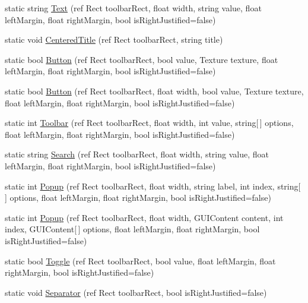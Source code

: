 \begin{DoxyCompactItemize}
\item 
static string \hyperlink{classi_c_s___toolbar_utility_a828d8ef03673fa9ca0ac975ea54c107c}{Text} (ref Rect toolbar\+Rect, float width, string value, float left\+Margin, float right\+Margin, bool is\+Right\+Justified=false)
\item 
static void \hyperlink{classi_c_s___toolbar_utility_a27830d2afaa33f6ea20f2902aba76610}{Centered\+Title} (ref Rect toolbar\+Rect, string title)
\item 
static bool \hyperlink{classi_c_s___toolbar_utility_aa10b6772c9b08273ec8ab80703292d71}{Button} (ref Rect toolbar\+Rect, bool value, Texture texture, float left\+Margin, float right\+Margin, bool is\+Right\+Justified=false)
\item 
static bool \hyperlink{classi_c_s___toolbar_utility_af9750ad44ed9e1962da00ee9c7672781}{Button} (ref Rect toolbar\+Rect, float width, bool value, Texture texture, float left\+Margin, float right\+Margin, bool is\+Right\+Justified=false)
\item 
static int \hyperlink{classi_c_s___toolbar_utility_a6de127573fc0a3d8dfc30e1efbc7306e}{Toolbar} (ref Rect toolbar\+Rect, float width, int value, string\mbox{[}$\,$\mbox{]} options, float left\+Margin, float right\+Margin, bool is\+Right\+Justified=false)
\item 
static string \hyperlink{classi_c_s___toolbar_utility_a0ed13ac54dcc3925a41913a212ee885e}{Search} (ref Rect toolbar\+Rect, float width, string value, float left\+Margin, float right\+Margin, bool is\+Right\+Justified=false)
\item 
static int \hyperlink{classi_c_s___toolbar_utility_a348a67a3d7e431a261d2cf1baf67e297}{Popup} (ref Rect toolbar\+Rect, float width, string label, int index, string\mbox{[}$\,$\mbox{]} options, float left\+Margin, float right\+Margin, bool is\+Right\+Justified=false)
\item 
static int \hyperlink{classi_c_s___toolbar_utility_a9fec07fdc80b26c4c592582c1f0efadd}{Popup} (ref Rect toolbar\+Rect, float width, G\+U\+I\+Content content, int index, G\+U\+I\+Content\mbox{[}$\,$\mbox{]} options, float left\+Margin, float right\+Margin, bool is\+Right\+Justified=false)
\item 
static bool \hyperlink{classi_c_s___toolbar_utility_a4589401f4adb33d223c5ed1c661fde05}{Toggle} (ref Rect toolbar\+Rect, bool value, float left\+Margin, float right\+Margin, bool is\+Right\+Justified=false)
\item 
static void \hyperlink{classi_c_s___toolbar_utility_a1d966688d7ad1f6c47035b1932451c31}{Separator} (ref Rect toolbar\+Rect, bool is\+Right\+Justified=false)
\end{DoxyCompactItemize}



